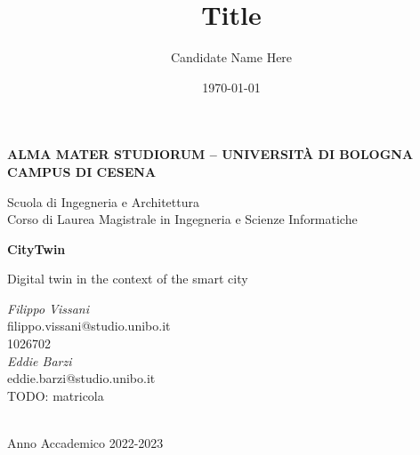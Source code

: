 \title{Title}
\author{Candidate Name Here}
\date{\today}

\begin{titlepage}
	\begin{center}
		
		\large
		\textbf{ALMA MATER STUDIORUM -- UNIVERSITÀ DI BOLOGNA \\ CAMPUS DI CESENA}
		\\
		\noindent\hrulefill
		\vspace{0.4cm}
		
		\Large
		Scuola di Ingegneria e Architettura \\
		Corso di Laurea Magistrale in Ingegneria e Scienze Informatiche
		
		\Huge
		\vspace{4cm}
		\textbf{
			CityTwin
		}
		
		\large
		\vspace{1cm}
		Digital twin in the context of the smart city
		\\
		\vspace{5.5cm}
		\begin{minipage}[t]{0.64\textwidth}
			\begin{flushleft} 
				\textit{Filippo Vissani}
				\\
				filippo.vissani@studio.unibo.it
				\\
				1026702
				\\
				\vspace{0.4cm}
				\textit{Eddie Barzi}
				\\
				eddie.barzi@studio.unibo.it
				\\ TODO: matricola
			\end{flushleft}
		\end{minipage}
		
		\vfill
		\noindent\hrulefill
		\vspace{0.3cm}
		\Large
		\\
		Anno Accademico 2022-2023
	\end{center}
\end{titlepage}
\restoregeometry

